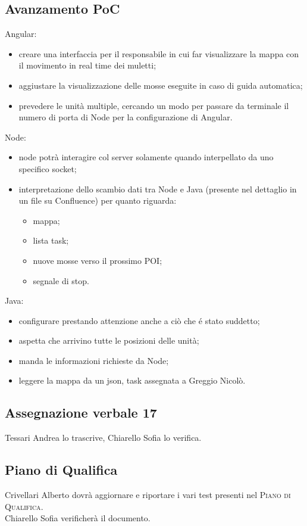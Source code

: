 \subsection{Avanzamento PoC}
Angular:
\begin{itemize}
	\item creare una interfaccia per il responsabile in cui far visualizzare la mappa con il movimento in real time dei muletti;
	\item aggiustare la visualizzazione delle mosse eseguite in caso di guida automatica;
	\item prevedere le unità multiple, cercando un modo per passare da terminale il numero di porta di Node per la configurazione di Angular.
\end{itemize}
Node:
\begin{itemize}
	\item node potrà interagire col server solamente quando interpellato da uno specifico socket;
	\item interpretazione dello scambio dati tra Node e Java (presente nel dettaglio in un file su Confluence) per quanto riguarda:
	\begin{itemize}
		\item mappa;
		\item lista task;
		\item nuove mosse verso il prossimo POI;
		\item segnale di stop.
	\end{itemize}
\end{itemize}
Java:
\begin{itemize}
	\item configurare prestando attenzione anche a ciò che é stato suddetto;
	\item aspetta che arrivino tutte le posizioni delle unità;
	\item manda le informazioni richieste da Node;
	\item leggere la mappa da un json, task assegnata a Greggio Nicolò.
\end{itemize}

\subsection{Assegnazione verbale 17}
Tessari Andrea lo trascrive, Chiarello Sofia lo verifica.

\subsection{Piano di Qualifica}
Crivellari Alberto dovrà aggiornare e riportare i vari test presenti nel \textsc{Piano di Qualifica}.\\
Chiarello Sofia verificherà il documento.

